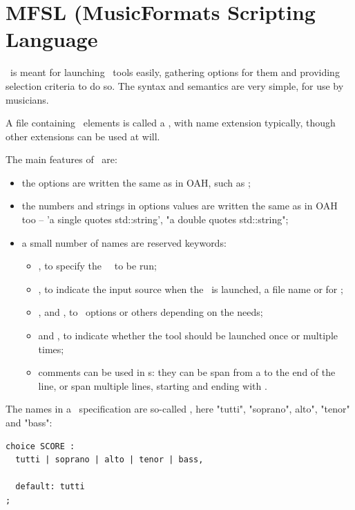 
\chapter{MFSL (MusicFormats Scripting Language}

\mfslLang\ is meant for launching \mf\ tools easily, gathering options for them and providing selection criteria to do so. The syntax and semantics are very simple, for use by musicians.

A file containing \mfslLang\ elements is called a {\it \script}, with name extension  typically, though other extensions can be used at will.

The main features of \mfslLang\ are:
\begin{itemize}
\item the options are written the same as in OAH, such as ;

\item the numbers and strings in options values are written the same as in OAH too -- 'a single quotes std::string', "a double quotes std::string";

\item a small number of names are reserved keywords:
\begin{itemize}
\item {}, to specify the \mf\ \tool\ to be run;
\item {}, to indicate the input source when the \tool\ is launched, a file name or \code{-} for \standardInput;
\item {},  and , to \select\ options or others depending on the needs;
\item {} and , to indicate whether the tool should be launched once or multiple times;
\item comments can be used in \script s: they can be span from a \code{\#} to the end of the line, or span multiple lines, starting and ending with \code{\#\#\#}.
\end{itemize}
\end{itemize}

The names in a \choice\ specification are so-called , here "tutti", "soprano", alto", "tenor" and "bass":
\begin{lstlisting}[language=MFSL]
choice SCORE :
  tutti | soprano | alto | tenor | bass,

  default: tutti
;
\end{lstlisting}

